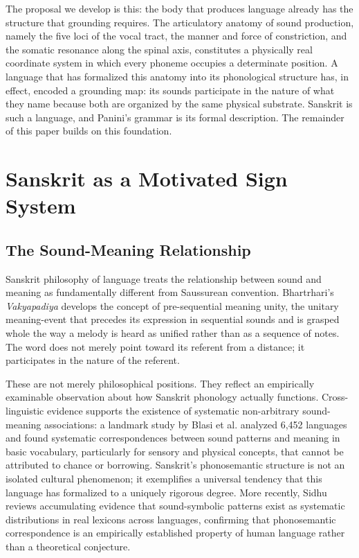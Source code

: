 \documentclass[12pt]{article}
\begin{document}
The proposal we develop is this: the body that produces language already has the structure that grounding requires. The articulatory anatomy of sound production, namely the five loci of the vocal tract, the manner and force of constriction, and the somatic resonance along the spinal axis, constitutes a physically real coordinate system in which every phoneme occupies a determinate position. A language that has formalized this anatomy into its phonological structure has, in effect, encoded a grounding map: its sounds participate in the nature of what they name because both are organized by the same physical substrate. Sanskrit is such a language, and Panini's grammar is its formal description. The remainder of this paper builds on this foundation.


\section{Sanskrit as a Motivated Sign System}

\subsection{The Sound-Meaning Relationship}

Sanskrit philosophy of language treats the relationship between sound and meaning as fundamentally different from Saussurean convention. Bhartrhari's \textit{Vakyapadiya} \cite{bhartrhari450} develops the concept of pre-sequential meaning unity, the unitary meaning-event that precedes its expression in sequential sounds and is grasped whole the way a melody is heard as unified rather than as a sequence of notes. The word does not merely point toward its referent from a distance; it participates in the nature of the referent.

These are not merely philosophical positions. They reflect an empirically examinable observation about how Sanskrit phonology actually functions. Cross-linguistic evidence supports the existence of systematic non-arbitrary sound-meaning associations: a landmark study by Blasi et al. \cite{blasi2016} analyzed 6,452 languages and found systematic correspondences between sound patterns and meaning in basic vocabulary, particularly for sensory and physical concepts, that cannot be attributed to chance or borrowing. Sanskrit's phonosemantic structure is not an isolated cultural phenomenon; it exemplifies a universal tendency that this language has formalized to a uniquely rigorous degree. More recently, Sidhu \cite{sidhu2025} reviews accumulating evidence that sound-symbolic patterns exist as systematic distributions in real lexicons across languages, confirming that phonosemantic correspondence is an empirically established property of human language rather than a theoretical conjecture.
\end{document}
